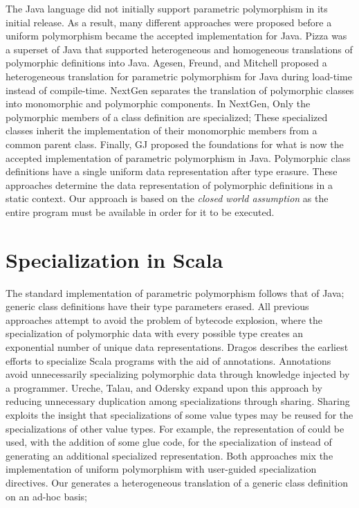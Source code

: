 The Java language did not initially support parametric polymorphism in its initial release.
As a result, many different approaches were proposed before a uniform polymorphism became the accepted implementation for Java.
Pizza\cite{java:pizza} was a superset of Java that supported heterogeneous and homogeneous translations of polymorphic definitions into Java.
Agesen, Freund, and Mitchell proposed a heterogeneous translation for parametric polymorphism for Java during load-time instead of compile-time\cite{java:agesen-type-params}.
NextGen\cite{java:nextgen} separates the translation of polymorphic classes into monomorphic and polymorphic components.
In NextGen, Only the polymorphic members of a class definition are specialized; These specialized classes inherit the implementation of their monomorphic members from a common parent class.
Finally, GJ\cite{java:odersky-type-params} proposed the foundations for what is now the accepted implementation of parametric polymorphism in Java.
Polymorphic class definitions have a single uniform data representation after type erasure.
These approaches determine the data representation of polymorphic definitions in a static context.
Our approach is based on the \textit{closed world assumption} as the entire program must be available in order for it to be executed.

\section{Specialization in Scala}

The standard implementation of parametric polymorphism follows that of Java; generic class definitions have their type parameters erased.
All previous approaches attempt to avoid the problem of bytecode explosion, where the specialization of polymorphic data with every possible type creates an exponential number of unique data representations.
Dragos describes the earliest efforts to specialize Scala programs with the aid of annotations\cite{scala:specialization}.
Annotations avoid unnecessarily specializing polymorphic data through knowledge injected by a programmer.
Ureche, Talau, and Odersky expand upon this approach by reducing unnecessary duplication among specializations through sharing\cite{scala:miniboxing}.
Sharing exploits the insight that specializations of some value types may be reused for the specializations of other value types.
For example, the representation of  could be used, with the addition of some glue code, for the specialization of  instead of generating an additional specialized representation. 
Both approaches mix the implementation of uniform polymorphism with user-guided specialization directives.
Our generates a heterogeneous translation of a generic class definition on an ad-hoc basis;

